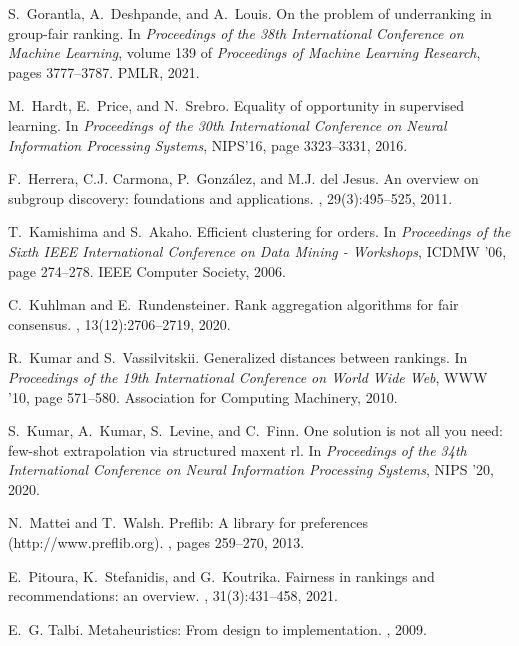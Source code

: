\documentclass[preprint,12pt]{article}
\theoremstyle{definition}
\theoremstyle{remark}
\theoremstyle{example} %
\begin{document}
\begin{thebibliography}{10}
S.~Gorantla, A.~Deshpande, and A.~Louis.
\newblock On the problem of underranking in group-fair ranking.
\newblock In {\em Proceedings of the 38th International Conference on Machine Learning}, volume 139 of {\em Proceedings of Machine Learning Research}, pages 3777--3787. PMLR, 2021.

M.~Hardt, E.~Price, and N.~Srebro.
\newblock Equality of opportunity in supervised learning.
\newblock In {\em Proceedings of the 30th International Conference on Neural Information Processing Systems}, NIPS'16, page 3323–3331, 2016.

F.~Herrera, C.J. Carmona, P.~Gonz\'{a}lez, and M.J. del Jesus.
\newblock An overview on subgroup discovery: foundations and applications.
, 29(3):495–525, 2011.

T.~Kamishima and S.~Akaho.
\newblock Efficient clustering for orders.
\newblock In {\em Proceedings of the Sixth IEEE International Conference on Data Mining - Workshops}, ICDMW '06, page 274–278. IEEE Computer Society, 2006.

C.~Kuhlman and E.~Rundensteiner.
\newblock Rank aggregation algorithms for fair consensus.
, 13(12):2706–2719, 2020.

R.~Kumar and S.~Vassilvitskii.
\newblock Generalized distances between rankings.
\newblock In {\em Proceedings of the 19th International Conference on World Wide Web}, WWW '10, page 571–580. Association for Computing Machinery, 2010.

S.~Kumar, A.~Kumar, S.~Levine, and C.~Finn.
\newblock One solution is not all you need: few-shot extrapolation via structured maxent rl.
\newblock In {\em Proceedings of the 34th International Conference on Neural Information Processing Systems}, NIPS '20, 2020.

N.~Mattei and T.~Walsh.
\newblock Preflib: A library for preferences (http://www.preflib.org).
, pages 259--270, 2013.

E.~Pitoura, K.~Stefanidis, and G.~Koutrika.
\newblock Fairness in rankings and recommendations: an overview.
, 31(3):431–458, 2021.

E.~G. Talbi.
\newblock Metaheuristics: From design to implementation.
, 2009.


\end{thebibliography}
\end{document}
